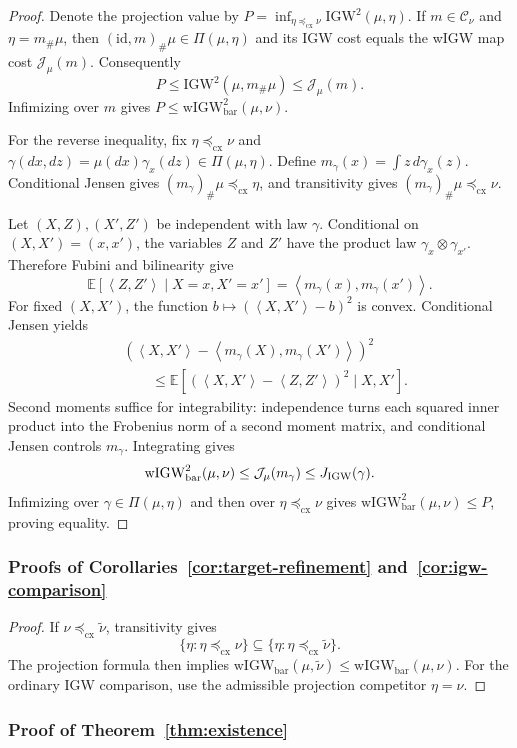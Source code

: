 \documentclass[11pt]{article}
\newcommand{\E}{\mathbb E}
\newcommand{\ip}[2]{\left\langle #1,#2\right\rangle}
\newcommand{\cx}{\preceq_{\mathrm{cx}}}
\newcommand{\wIGW}{\mathrm{wIGW}_{\mathrm{bar}}}
\newcommand{\IGW}{\mathrm{IGW}}
\theoremstyle{plain}
\theoremstyle{definition}
\theoremstyle{remark}
\begin{document}
\begin{proof}
Denote the projection value by
$P=\inf_{\eta\cx\nu}\IGW^2(\mu,\eta)$.  If $m\in\mathcal C_\nu$ and
$\eta=m_\#\mu$, then $(\mathrm{id},m)_\#\mu\in\Pi(\mu,\eta)$ and its IGW
cost equals the wIGW map cost $\mathcal J_\mu(m)$.  Consequently
\[
 P\le\IGW^2(\mu,m_\#\mu)\le \mathcal J_\mu(m).
\]
Infimizing over $m$ gives $P\le\wIGW^2(\mu,\nu)$.

For the reverse inequality, fix $\eta\cx\nu$ and
$\gamma(dx,dz)=\mu(dx)\gamma_x(dz)\in\Pi(\mu,\eta)$.  Define
$m_\gamma(x)=\int z\,d\gamma_x(z)$.  Conditional Jensen gives
$(m_\gamma)_\#\mu\cx\eta$, and transitivity gives
$(m_\gamma)_\#\mu\cx\nu$.

Let $(X,Z),(X',Z')$ be independent with law $\gamma$.  Conditional on
$(X,X')=(x,x')$, the variables $Z$ and $Z'$ have the product law
$\gamma_x\otimes\gamma_{x'}$.  Therefore Fubini and bilinearity give
\[
 \E[\ip{Z}{Z'}\mid X=x,X'=x']
 =\ip{m_\gamma(x)}{m_\gamma(x')}.
\]
For fixed $(X,X')$, the function
$b\mapsto(\ip{X}{X'}-b)^2$ is convex.  Conditional Jensen yields
\begin{align*}
 &(\ip{X}{X'}-\ip{m_\gamma(X)}{m_\gamma(X')})^2\\
 &\qquad\le
 \E[(\ip{X}{X'}-\ip{Z}{Z'})^2\mid X,X'].
\end{align*}
Second moments suffice for integrability: independence turns each squared inner
product into the Frobenius norm of a second moment matrix, and conditional Jensen
controls $m_\gamma$.  Integrating gives
\[
 \wIGW^2(\mu,\nu)\le \mathcal J_\mu(m_\gamma)\le J_{\rm IGW}(\gamma).
\]
Infimizing over $\gamma\in\Pi(\mu,\eta)$ and then over $\eta\cx\nu$ gives
$\wIGW^2(\mu,\nu)\le P$, proving equality.
\end{proof}

\subsubsection{Proofs of Corollaries~\ref{cor:target-refinement}
and~\ref{cor:igw-comparison}}
\label{proof:6.2}\label{proof:6.3}

\begin{proof}
If $\nu\cx\widetilde\nu$, transitivity gives
\[
 \{\eta:\eta\cx\nu\}\subseteq
 \{\eta:\eta\cx\widetilde\nu\}.
\]
The projection formula then implies
$\wIGW(\mu,\widetilde\nu)\le\wIGW(\mu,\nu)$.  For the ordinary IGW
comparison, use the admissible projection competitor $\eta=\nu$.
\end{proof}

\subsubsection{Proof of Theorem~\ref{thm:existence}}\label{proof:6.4}
\end{document}
